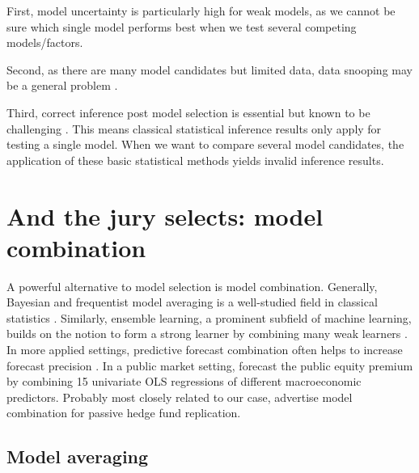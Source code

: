 \documentclass[12pt]{article}
\begin{document}
First, model uncertainty is particularly high for weak models, as we cannot be sure which single model performs best when we test several competing models/factors.

Second, as there are many model candidates but limited data, data snooping may be a general problem \citep{W00}. 

Third,  correct inference post model selection is essential but known to be challenging \citep{BLP19}. 
This means classical statistical inference results only apply for testing a single model. 
When we want to compare several model candidates, the application of these basic statistical methods yields invalid inference results.


\section{And the jury selects: model combination}
\label{sec:model_combination}

A powerful alternative to model selection is model combination.
Generally, Bayesian and frequentist model averaging is a well-studied field in classical statistics \citep{H14,M15}.
Similarly, ensemble learning, a prominent subfield of machine learning, builds on the notion to form a strong learner by combining many weak learners \citep{B12}.
In more applied settings, predictive forecast combination often helps to increase forecast precision \citep{HL10}.
In a public market setting, \cite{RSZ10} forecast the public equity premium by combining 15 univariate OLS regressions of different macroeconomic predictors.
Probably most closely related to our case, \cite{OST17} advertise model combination for passive hedge fund replication.


\subsection{Model averaging}
\label{sec:model_averaging}
\end{document}
